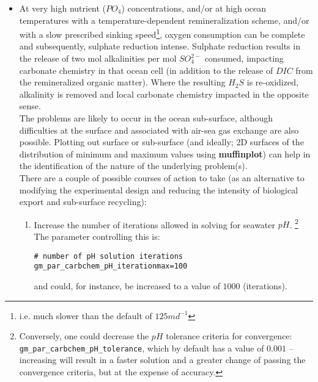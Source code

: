 \documentclass[11pt,fleqn]{book} %
\begin{document}
\begin{enumerate}[noitemsep]
\begin{itemize}[noitemsep]
\vspace{1mm}
\item At very high nutrient (\(PO_{4}\)) concentrations, and/or at high ocean temperatures with a temperature-dependent remineralization scheme, and/or with a slow prescribed sinking speed\footnote{i.e. much slower than the default of \(125 md^{-1}\)}, oxygen consumption can be complete and subsequently, sulphate reduction intense. Sulphate reduction results in the release of two mol alkalinities per mol \(SO^{2-}_{4}\) consumed, impacting carbonate chemistry in that ocean cell (in addition to the release of \(DIC\) from the remineralized organic matter). Where the resulting \(H_{2}S\) is re-oxidized, alkalinity is removed and local carbonate chemistry impacted in the opposite sense.
\\The problems are likely to occur in the ocean sub-surface, although difficulties at the surface and associated with air-sea gas exchange are also possible. Plotting out surface or sub-surface (and ideally; 2D surfaces of the distribution of minimum and maximum values using \textbf{muffinplot}) can help in the identification of the nature of the underlying problem(s).
\\There are a couple of possible courses of action to take (as an alternative to modifying the experimental design and reducing the intensity of biological export and sub-surface recycling):
\begin{enumerate}[noitemsep]

\vspace{1mm}
\item Increase the number of iterations allowed in solving for seawater \(pH\).
\footnote{Conversely, one could decrease the \(pH\) tolerance criteria for convergence: \texttt{gm\_par\_carbchem\_pH\_tolerance}, which by default has a value of \(0.001\) -- increasing will result in a faster solution and a greater change of passing the convergence criteria, but at the expense of accuracy.}
The parameter controlling this is:
\vspace{-0pt}\small\begin{verbatim}
# number of pH solution iterations
gm_par_carbchem_pH_iterationmax=100
\end{verbatim}\normalsize\vspace{-0pt}
and could, for instance, be increased to a value of \(1000\) (iterations).


\end{enumerate}
\end{itemize}
\end{enumerate}
\end{document}
